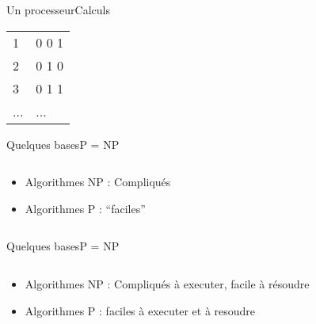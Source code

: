 \documentclass{beamer}
\begin{document}
\begin{frame}{Un processeur}{Calculs}
  \begin{tabular}{l|l}
    1 & 0 0 1 \\
    2 & 0 1 0 \\
    3 & 0 1 1 \\
    ... & ... \\
  \end{tabular}
\end{frame}

\begin{frame}{Quelques bases}{P = NP}
  \begin{columns}
    \begin{column}{0.5\textwidth}
      \begin{itemize}
        \color{red}
      \item Algorithmes NP : Compliqu\'{e}s
        \color{blue}
      \item Algorithmes P : ``faciles''
      \end{itemize}
    \end{column}
  
    \begin{column}{0.5\textwidth}
    \end{column}
  \end{columns}
\end{frame}

\begin{frame}{Quelques bases}{P = NP}
  \begin{columns}
    \begin{column}{0.5\textwidth}
      \begin{itemize}
        \color{red}
      \item Algorithmes NP : Compliqu\'{e}s \`a executer, facile \`a r\'esoudre
        \color{blue}
      \item Algorithmes P : faciles \`a executer et \`a resoudre
      \end{itemize}
    \end{column}
  
    \begin{column}{0.5\textwidth}
    \end{column}
  \end{columns}
\end{frame}
\end{document}
